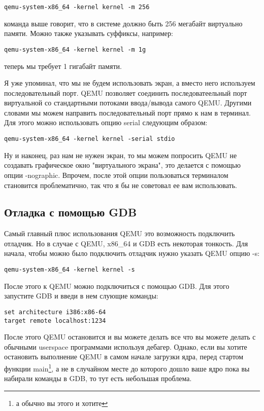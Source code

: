\begin{verbatim}
qemu-system-x86_64 -kernel kernel -m 256
\end{verbatim}

команда выше говорит, что в системе должно быть 256 мегабайт виртуально памяти.
Можно также указывать суффиксы, например:

\begin{verbatim}
qemu-system-x86_64 -kernel kernel -m 1g
\end{verbatim}

теперь мы требует 1 гигабайт памяти.

Я уже упоминал, что мы не будем использовать экран, а вместо него используем
последовательный порт. QEMU позволяет соединить последоватеельный порт
виртуальной со стандартными потоками ввода/вывода самого QEMU. Другими словами
мы можем направить последовательный порт прямо к нам в терминал. Для этого можно
использовать опцию serial следующим образом:

\begin{verbatim}
qemu-system-x86_64 -kernel kernel -serial stdio
\end{verbatim}

Ну и наконец, раз нам не нужен экран, то мы можем попросить QEMU не создавать
графическое окно "виртуального экрана", это делается с помощью опции -nographic.
Впрочем, после этой опции пользоваться терминалом становится проблематично, так
что я бы не советовал ее вам использовать.

\subsection{Отладка с помощью GDB}

Самый главный плюс использования QEMU это возможность подключить отладчик. Но
в случае с QEMU, x86\_64 и GDB есть некоторая тонкость. Для начала, чтобы можно
было подключить отладчик нужно указать QEMU опцию -s:

\begin{verbatim}
qemu-system-x86_64 -kernel kernel -s
\end{verbatim}

После этого к QEMU можно подключиться с помощью GDB. Для этого запустите GDB и введи в нем слующие команды:

\begin{verbatim}
set architecture i386:x86-64
target remote localhost:1234
\end{verbatim}

После этого QEMU остановится и вы можете делать все что вы можете делать с
обычными userspace программами используя дебагер. Однако, если вы хотите
остановить выполнение QEMU в самом начале загрузки ядра, перед стартом функции
main\footnote{а обычно вы этого и хотите}, а не в случайном месте до которого
дошло ваше ядро пока вы набирали команды в GDB, то тут есть небольшая проблема.

